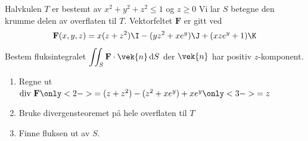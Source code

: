 \begin{frame}
    \begin{example}
        Halvkulen $T$ er bestemt av 
        $x^2 + y^2 + z^2 \leq 1$ og $z \geq 0$
        Vi lar $S$ betegne den krumme delen av overflaten til $T$. 
        Vektorfeltet $\mathbf{F}$ er gitt ved 
        \begin{equation*}
            \mathbf{F}(x,y,z)
            = x(z+z^2)\I - (yz^2 + xe^y)\J + (xze^y + 1)\K
        \end{equation*}
        Bestem fluksintegralet 
        $ \displaystyle
        \iint_{S} \mathbf{F} \cdot \vek{n} \, \mathrm{d}S
        $
        der $\vek{n}$ har positiv $z$-komponent. 
      \end{example}
      \begin{enumerate}
        \item Regne ut $\text{div } \mathbf{F} \only<2->{=(z + z^2)-(z^2 + xe^y)
          + xe^y} \only<3->{=z}$
      \end{enumerate}
      \begin{enumerate}\setcounter{enumi}{1}
        \item Bruke divergensteoremet på hele overflaten til $T$
      \end{enumerate}
      \begin{enumerate}\setcounter{enumi}{2}
        \item Finne fluksen ut av $S$.
    \end{enumerate}

\end{frame}


